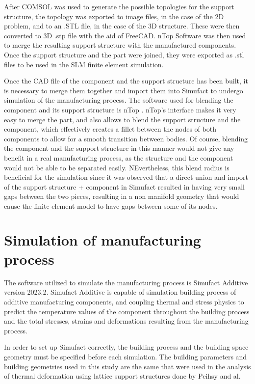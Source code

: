 \documentclass[../main.tex]{subfiles}
\begin{document}
After COMSOL was used to generate the possible topologies for the support structure, the topology was exported to image files, in the case of the 2D problem, and to an .STL file, in the case of the 3D structure. These were then converted to 3D .stp file with the aid of FreeCAD. nTop Software was then used to merge the resulting support structure with the manufactured components. Once the support structure and the part were joined, they were exported as .stl files to be used in the SLM finite element simulation.

Once the CAD file of the component and the support structure has been built, it is necessary to merge them together and import them into Simufact to undergo simulation of the manufacturing process. The software used for blending the component and its support structure is nTop . nTop's interface makes it very easy to merge the part, and also allows to blend the support structure and the component, which effectively creates a fillet between the nodes of both components to allow for a smooth transition between bodies. Of course, blending the component and the support structure in this manner would not give any benefit in a real manufacturing process, as the structure and the component would not be able to be separated easily. NEvertheless, this blend radius is beneficial for the simulation since it was observed that a direct union and import of the support structure + component in Simufact resulted in having very small gaps between the two pieces, resulting in a non manifold geometry that would cause the finite element model to have gaps between some of its nodes. 


\section{Simulation of manufacturing process}

The software utilized to simulate the manufacturing process is Simufact Additive version 2023.2. Simufact Additive is capable of simulation building process of additive manufacturing components, and coupling thermal and stress physics to predict the temperature values of the component throughout the building process and the total stresses, strains and deformations resulting from the manufacturing process. 

In order to set up Simufact correctly, the building process and the building space geometry must be specified before each simulation. The building parameters and building geometries used in this study are the same that were used in the analysis of thermal deformation using lattice support structures done by Peihsy and al. 
\end{document}
